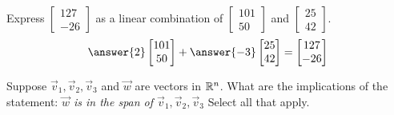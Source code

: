 \documentclass{ximera}
\begin{document}
\begin{exercise}
Express $\begin{bmatrix}127\\-26\end{bmatrix}$ as a linear combination of $\begin{bmatrix}101\\50\end{bmatrix}$ and $\begin{bmatrix}25\\42\end{bmatrix}$.
$$\answer{2}\begin{bmatrix}101\\50\end{bmatrix}+\answer{-3}\begin{bmatrix}25\\42\end{bmatrix}=\begin{bmatrix}127\\-26\end{bmatrix}$$
\end{exercise}

\begin{exercise}
Suppose $\vec{v}_1, \vec{v}_2, \vec{v}_3$ and $\vec{w}$ are vectors in $\mathbb{R}^n$.  What are the implications of the statement: \textit{$\vec{w}$ is in the span of $\vec{v}_1, \vec{v}_2, \vec{v}_3$}
Select all that apply.
\begin{selectAll}
 \end{selectAll}
\end{exercise}
\end{document}
